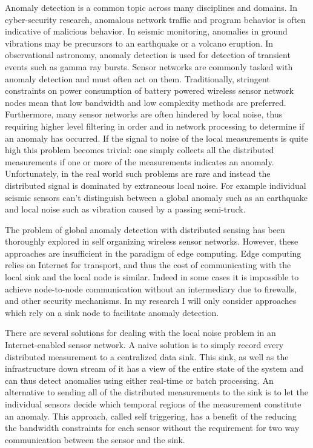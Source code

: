 Anomaly detection is a common topic across many disciplines and domains. In cyber-security research, anomalous network traffic and program behavior is often indicative of malicious behavior. In seismic monitoring, anomalies in ground vibrations may be precursors to an earthquake or a volcano eruption. In observational astronomy, anomaly detection is used for detection of transient events such as gamma ray bursts. Sensor networks are commonly tasked with anomaly detection and must often act on them. Traditionally, stringent constraints on power consumption of battery powered wireless sensor network nodes mean that low bandwidth and low complexity methods are preferred. Furthermore, many sensor networks are often hindered by local noise, thus requiring higher level filtering in order and in network processing to determine if an anomaly has occurred. If the signal to noise of the local measurements is quite high this problem becomes trivial: one simply collects all the distributed measurements if one or more of the measurements indicates an anomaly. Unfortunately, in the real world such problems are rare and instead the distributed signal is dominated by extraneous local noise. For example individual seismic sensors can't distinguish between a global anomaly such as an earthquake and local noise such as vibration caused by a passing semi-truck. 

The problem of global anomaly detection with distributed sensing has been thoroughly explored in self organizing wireless sensor networks. However, these approaches are insufficient in the paradigm of edge computing. Edge computing relies on Internet for transport, and thus the cost of communicating with the local sink and the local node is similar. Indeed in some cases it is impossible to achieve node-to-node communication without an intermediary due to firewalls, and other security mechanisms. In my research I will only consider approaches which rely on a sink node to facilitate anomaly detection.

There are several solutions for dealing with the local noise problem in an Internet-enabled sensor network. A naive solution is to simply record every distributed measurement to a centralized data sink. This sink, as well as the infrastructure down stream of it has a view of the entire state of the system and can thus detect anomalies using either real-time or batch processing. An alternative to sending all of the distributed measurements to the sink is to let the individual sensors decide which temporal regions of the measurement constitute an anomaly. This approach, called self triggering, has a benefit of the reducing the bandwidth constraints for each sensor without the requirement for two way communication between the sensor and the sink.

